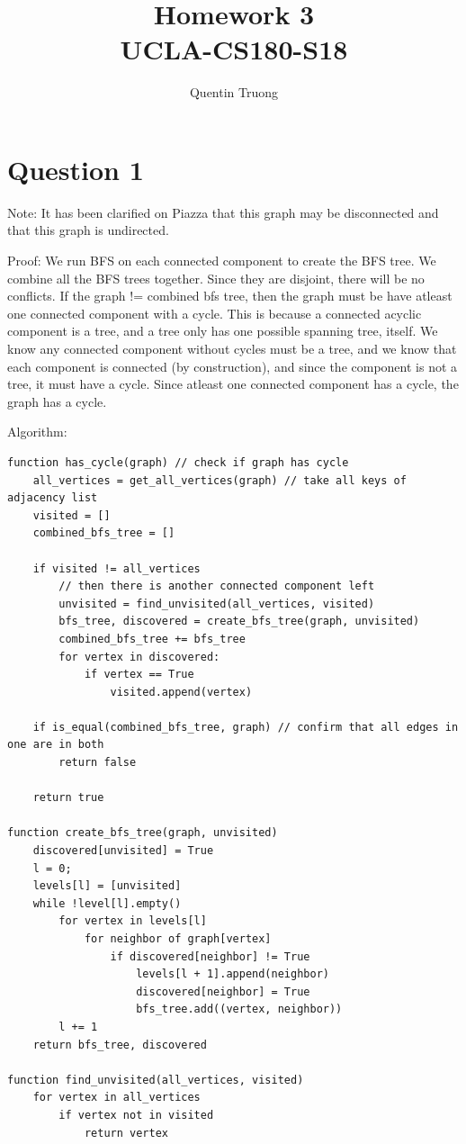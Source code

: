 \documentclass[11pt, oneside]{article}
\title{Homework 3\\UCLA-CS180-S18}
\author{Quentin Truong}
\begin{document}
\maketitle
{}


\section{Question 1}

Note: \newline
It has been clarified on Piazza that this graph may be disconnected and that this graph is undirected. \newline

Proof: \newline
We run BFS on each connected component to create the BFS tree.
We combine all the BFS trees together. Since they are disjoint, there will be no conflicts.
If the graph != combined bfs tree, then the graph must be have atleast one connected component with a cycle.
This is because a connected acyclic component is a tree, and a tree only has one possible spanning tree, itself.
We know any connected component without cycles must be a tree, and we know that each component is connected (by construction), and since the component is not a tree, it must have a cycle.
Since atleast one connected component has a cycle, the graph has a cycle. \newline

Algorithm: \newline
\begin{lstlisting}
function has_cycle(graph) // check if graph has cycle
    all_vertices = get_all_vertices(graph) // take all keys of adjacency list
    visited = []
    combined_bfs_tree = []

    if visited != all_vertices
        // then there is another connected component left
        unvisited = find_unvisited(all_vertices, visited)
        bfs_tree, discovered = create_bfs_tree(graph, unvisited)
        combined_bfs_tree += bfs_tree
        for vertex in discovered:
            if vertex == True
                visited.append(vertex)

    if is_equal(combined_bfs_tree, graph) // confirm that all edges in one are in both
        return false

    return true

function create_bfs_tree(graph, unvisited)
    discovered[unvisited] = True
    l = 0;
    levels[l] = [unvisited]
    while !level[l].empty()
        for vertex in levels[l]
            for neighbor of graph[vertex]
                if discovered[neighbor] != True
                    levels[l + 1].append(neighbor)
                    discovered[neighbor] = True
                    bfs_tree.add((vertex, neighbor))
        l += 1
    return bfs_tree, discovered

function find_unvisited(all_vertices, visited)
    for vertex in all_vertices
        if vertex not in visited
            return vertex

\end{lstlisting}
\end{document}
